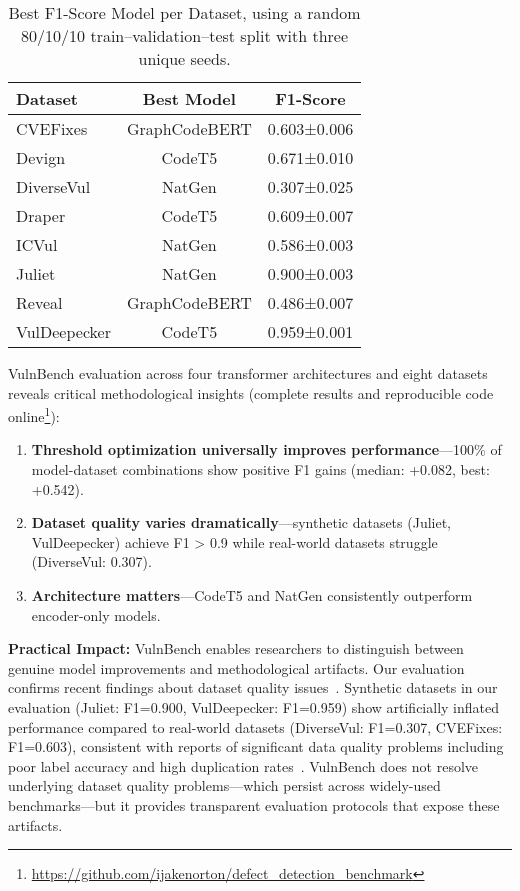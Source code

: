 \documentclass[letterpaper]{article}
\begin{document}
\begin{table}[ht]
	\centering
	\caption{Best F1-Score Model per Dataset, using a random 80/10/10 train–validation–test split with three unique seeds.}
	\label{tab:results}
	\begin{tabular}{lcc}
		\toprule
		Dataset      & Best Model    & F1-Score    \\
		\midrule
		CVEFixes     & GraphCodeBERT & 0.603±0.006 \\
		Devign       & CodeT5        & 0.671±0.010 \\
		DiverseVul   & NatGen        & 0.307±0.025 \\
		Draper       & CodeT5        & 0.609±0.007 \\
		ICVul        & NatGen        & 0.586±0.003 \\
		Juliet       & NatGen        & 0.900±0.003 \\
		Reveal       & GraphCodeBERT & 0.486±0.007 \\
		VulDeepecker & CodeT5        & 0.959±0.001 \\
		\bottomrule
	\end{tabular}
\end{table}

VulnBench evaluation across four transformer architectures and eight datasets reveals critical methodological insights
(complete results and reproducible code online\footnote{\url{https://github.com/ijakenorton/defect_detection_benchmark}}):
\begin{enumerate}
	\item \textbf{Threshold optimization universally improves performance}---100\% of model-dataset combinations show positive F1 gains (median: +0.082, best: +0.542).
	\item \textbf{Dataset quality varies dramatically}---synthetic datasets (Juliet, VulDeepecker) achieve F1 > 0.9 while real-world datasets struggle (DiverseVul: 0.307).
	\item \textbf{Architecture matters}---CodeT5 and NatGen consistently outperform encoder-only models.
\end{enumerate}


\textbf{Practical Impact:} VulnBench enables researchers to distinguish between genuine model improvements and methodological artifacts. Our evaluation confirms recent findings about dataset quality issues~\citep{ding2025vulnerability,chen2023diversevul}. Synthetic datasets in our evaluation (Juliet: F1=0.900, VulDeepecker: F1=0.959) show artificially inflated performance compared to real-world datasets (DiverseVul: F1=0.307, CVEFixes: F1=0.603), consistent with reports of significant data quality problems including poor label accuracy and high duplication rates~\cite{ding2025vulnerability}. VulnBench does not resolve underlying dataset quality problems---which persist across widely-used benchmarks---but it provides transparent evaluation protocols that expose these artifacts. %
\end{document}
